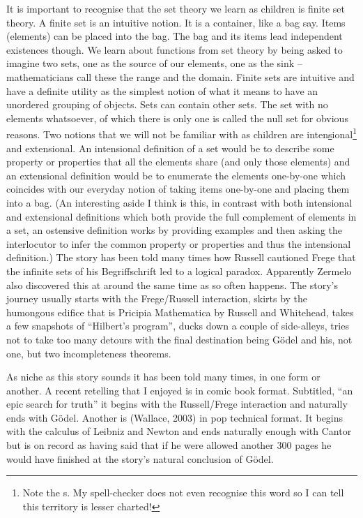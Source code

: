 \documentclass[dah,phd,a4paper]{xe_uccthesis}
\begin{document}
It is important to recognise that the set theory we learn as children is finite set theory. A finite set is an intuitive notion. It is a container, like a bag say. Items (elements) can be placed into the bag. The bag and its items lead independent existences though. We learn about functions from set theory by being asked to imagine two sets, one as the source of our elements, one as the sink – mathematicians call these the range and the domain. Finite sets are intuitive and have a definite utility as the simplest notion of what it means to have an unordered grouping of objects. Sets can contain other sets. The set with no elements whatsoever, of which there is only one is called the null set for obvious reasons. Two notions that we will not be familiar with as children are inten\underline{s}ional\footnote{Note the s. My spell-checker does not even recognise this word so I can tell this territory is lesser charted!} and extensional. An intensional definition of a set would be to describe some property or properties that all the elements share (and only those elements) and an extensional definition would be to enumerate the elements one-by-one which coincides with our everyday notion of taking items one-by-one and placing them into a bag. (An interesting aside I think is this, in contrast with both intensional and extensional definitions which both provide the full complement of elements in a set, an ostensive definition works by providing examples and then asking the interlocutor to infer the common property or properties and thus the intensional definition.)
The story has been told many times how Russell cautioned Frege that the infinite sets of his Begriffschrift led to a logical paradox. Apparently Zermelo also discovered this at around the same time as so often happens.
The story's journey usually starts with the Frege/Russell interaction, skirts by the humongous edifice that is Pricipia Mathematica by Russell and Whitehead, takes a few snapshots of “Hilbert's program”, ducks down a couple of side-alleys, tries not to take too many detours with the final destination being Gödel and his, not one, but two incompleteness theorems.

As niche as this story sounds it has been told many times, in one form or another. A recent retelling that I enjoyed is \citep{doxiadis_logicomix_2009} in comic book format. Subtitled, “an epic search for truth” it begins with the Russell/Frege interaction and naturally ends with Gödel. Another is (Wallace, 2003) in pop technical format. It begins with the calculus of Leibniz and Newton and ends naturally enough with Cantor but is on record as having said that if he were allowed another 300 pages he would have finished at the story's natural conclusion of Gödel.
\end{document}
